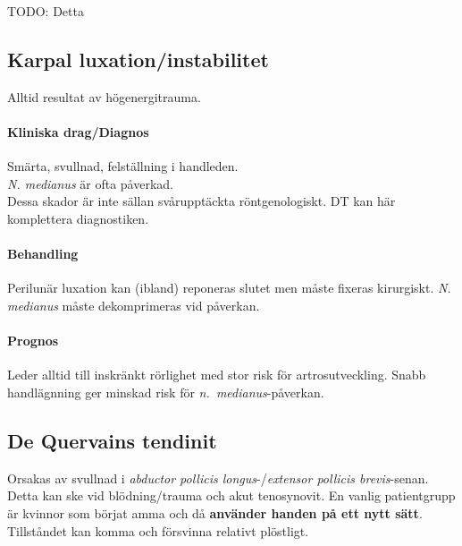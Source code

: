 \documentclass[
  letterpaper,
  DIV=11,
  numbers=noendperiod]{scrreport}
\let\oldparagraph\paragraph
\renewcommand{\paragraph}[1]{\oldparagraph{#1}\mbox{}}
\begin{document}
TODO: Detta

\hypertarget{karpal-luxationinstabilitet}{%
\subsection{Karpal
luxation/instabilitet}\label{karpal-luxationinstabilitet}}

Alltid resultat av högenergitrauma.

\hypertarget{kliniska-dragdiagnos-7}{%
\paragraph{Kliniska drag/Diagnos}\label{kliniska-dragdiagnos-7}}

Smärta, svullnad, felställning i handleden.\\
\emph{N. medianus} är ofta påverkad.\\
Dessa skador är inte sällan svårupptäckta röntgenologiskt. DT kan här
komplettera diagnostiken.

\hypertarget{behandling-8}{%
\paragraph{Behandling}\label{behandling-8}}

Perilunär luxation kan (ibland) reponeras slutet men måste fixeras
kirurgiskt. \emph{N. medianus} måste dekomprimeras vid påverkan.

\hypertarget{prognos-7}{%
\paragraph{Prognos}\label{prognos-7}}

Leder alltid till inskränkt rörlighet med stor risk för
artrosutveckling. Snabb handlägnning ger minskad risk för
\emph{n.~medianus}-påverkan.

\hypertarget{de-quervains-tendinit}{%
\subsection{De Quervains tendinit}\label{de-quervains-tendinit}}

Orsakas av svullnad i \emph{abductor pollicis longus}-/\emph{extensor
pollicis brevis}-senan.\\
Detta kan ske vid blödning/trauma och akut tenosynovit. En vanlig
patientgrupp är kvinnor som börjat amma och då \textbf{använder handen
på ett nytt sätt}. Tillståndet kan komma och försvinna relativt
plöstligt.
\end{document}
